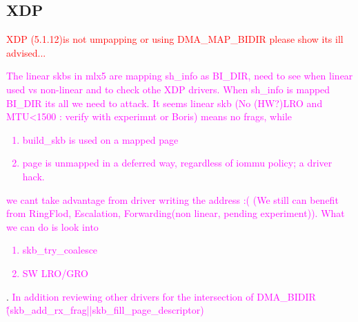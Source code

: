 \subsection{XDP}
\textcolor{red}{XDP (5.1.12)is not umpapping or using DMA\_MAP\_BIDIR \- please show its ill advised...} \textcolor{magenta}{The linear skbs in mlx5 are mapping sh\_info as BI\_DIR, need to see when linear used vs non-linear and to check othe XDP drivers. When sh\_info is mapped BI\_DIR its all we need to attack.\newline
It seems linear skb (No (HW?)LRO and MTU<1500 : verify with experimnt or Boris) means no frags, while \begin{enumerate}
    \item build\_skb is used on a mapped page
    \item page is unmapped in a deferred way, regardless of iommu policy; a driver hack.
\end{enumerate} 
we cant take advantage from driver writing the \page address :( (We still can benefit from RingFlod, Escalation, Forwarding(non linear, pending experiment)). What we can do is look into \begin{enumerate}
    \item skb\_try\_coalesce
    \item SW LRO/GRO
\end{enumerate}}.
\newline
\textcolor{magenta}{In addition reviewing other drivers for the intersection of DMA\_BIDIR \^ (skb\_add\_rx\_frag||skb\_fill\_page\_descriptor)}